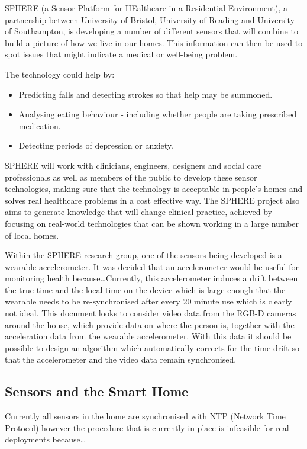 \href{http://www.irc-sphere.ac.uk/}{SPHERE (a Sensor Platform for HEalthcare in a Residential Environment)}, a partnership between University of Bristol, University of Reading and University of Southampton, is developing a number of different sensors that will combine to build a picture of how we live in our homes. This information can then be used to spot issues that might indicate a medical or well-being problem.

The technology could help by:
\begin{itemize}
    \item Predicting falls and detecting strokes so that help may be summoned.
    \item Analysing eating behaviour - including whether people are taking prescribed medication.
    \item Detecting periods of depression or anxiety.
\end{itemize}
\cite{sphere_website}


SPHERE will work with clinicians, engineers, designers and social care professionals as well as members of the public to develop these sensor technologies, making sure that the technology is acceptable in people's homes and solves real healthcare problems in a cost effective way. The SPHERE project also aims to generate knowledge that will change clinical practice, achieved by focusing on real-world technologies that can be shown working in a large number of local homes.

Within the SPHERE research group, one of the sensors being developed is a wearable accelerometer. It was decided that an accelerometer would be useful for monitoring health because\ldots Currently, this accelerometer induces a drift between the true time and the local time on the device which is large enough that the wearable needs to be re-synchronised after every 20 minute use which is clearly not ideal. This document looks to consider video data from the RGB-D cameras around the house, which provide data on where the person is, together with the acceleration data from the wearable accelerometer. With this data it should be possible to design an algorithm which automatically corrects for the time drift so that the accelerometer and the video data remain synchronised.

\subsection{Sensors and the Smart Home} 
Currently all sensors in the home are synchronised with NTP (Network Time Protocol) however the procedure that is currently in place is infeasible for real deployments because\ldots
 
